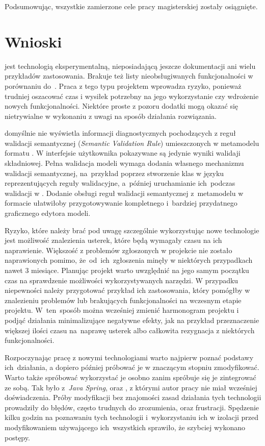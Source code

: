 Podsumowując, wszystkie zamierzone cele pracy magisterskiej zostały osiągnięte.

\section{Wnioski}

\SiriusWeb{} jest technologią eksperymentalną, nieposiadającą jeszcze
dokumentacji ani wielu przykładów zastosowania. Brakuje też listy
nieobsługiwanych funkcjonalności w porównaniu do~\SiriusDesktop{}. Praca z
tego typu projektem wprowadza ryzyko, ponieważ trudniej oszacować czas
i wysiłek potrzebny na jego wykorzystanie czy wdrożenie nowych funkcjonalności.
Niektóre proste z pozoru dodatki mogą okazać się nietrywialne w wykonaniu z
uwagi na sposób działania rozwiązania.

\SiriusWeb{} domyślnie nie wyświetla informacji diagnostycznych pochodzących z
reguł walidacji semantycznej (\emph{Semantic Validation Rule}) umieszczonych w
metamodelu formatu \Ecore{}. W interfejsie użytkownika pokazywane są jedynie
wyniki walidaji składniowej. Pełna walidacja modeli wymaga dodania własnego
mechanizmu walidacji semantycznej, na~przykład poprzez stworzenie klas w języku
\Java{} reprezentujących reguły walidacyjne, a~później uruchamianie ich~podczas
walidacji w \SiriusWeb{}. Dodanie obsługi reguł walidacji semantycznej
z~metamodelu w formacie \Ecore{} ułatwiłoby przygotowywanie kompletnego
i~bardziej przydatnego graficznego edytora modeli.

Ryzyko, które należy brać pod uwagę szczególnie wykorzystując nowe
technologie jest możliwość znalezienia usterek, które będą wymagały czasu na
ich naprawienie. Większość z problemów zgłoszonych w projekcie \SiriusWeb{}
nie zostało naprawionych pomimo, że~od~ich~zgłoszenia minęły w niektórych
przypadkach nawet 3 miesiące. Planując projekt warto uwzględnić na jego samym
początku czas na sprawdzenie możliwości wykorzystywanych narzędzi. W przypadku
niepewności należy przygotować przykład ich zastosowania, który pomógłby w
znalezieniu problemów lub brakujących funkcjonalności na wczesnym etapie
projektu. W~ten~sposób można wcześniej zmienić harmonogram projektu i podjąć
działania minimalizujące negatywne efekty, jak na przykład przeznaczenie
większej ilości czasu na~naprawę usterek albo całkowita rezygnacja z niektórych
funkcjonalności.

Rozpoczynając pracę z nowymi technologiami warto najpierw poznać podstawy
ich~działania, a dopiero później próbować je w znaczącym stopniu zmodyfikować.
Warto także spróbować wykorzystać je osobno zanim spróbuje się je
zintegrować ze sobą. Tak było z~\emph{Java Spring}, \Maven{} oraz
\EMF{}, z którymi autor pracy nie miał wcześniej doświadczenia. Próby
modyfikacji bez znajomości zasad działania tych technologii prowadziły do
błędów, często trudnych do zrozumienia, oraz frustracji. Spędzenie kilku godzin
na poznawaniu tych technologii i~wykorzystaniu ich w izolacji przed
modyfikowaniem \SiriusWeb{} używającego ich~wszystkich sprawiło, że
szybciej wykonano postępy.

